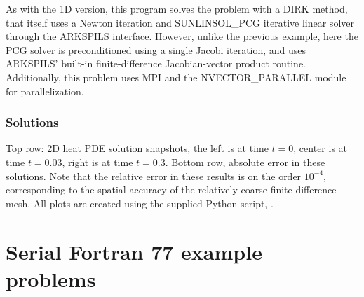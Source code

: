 \documentclass[letterpaper,10pt,english]{sphinxmanual}
\begin{document}
As with the 1D version, this program solves the problem with a DIRK
method, that itself uses a Newton iteration and SUNLINSOL\_PCG
iterative linear solver through the ARKSPILS interface.  However,
unlike the previous example, here the PCG solver is preconditioned
using a single Jacobi iteration, and uses ARKSPILS’ built-in
finite-difference Jacobian-vector product routine. Additionally, this
problem uses MPI and the NVECTOR\_PARALLEL module for parallelization.


\subsection{Solutions}
\label{\detokenize{cpp_parallel:solutions}}
Top row: 2D heat PDE solution snapshots, the left is at time \(t=0\),
center is at time \(t=0.03\), right is at time \(t=0.3\).
Bottom row, absolute error in these solutions.  Note that the relative
error in these results is on the order \(10^{-4}\), corresponding
to the spatial accuracy of the relatively coarse finite-difference
mesh.  All plots are created using the supplied Python script,
.

\noindent{}

\noindent{}

\noindent{}

\noindent{}

\noindent{}

\noindent{}


\chapter{Serial Fortran 77 example problems}
\label{\detokenize{f77_serial::doc}}\label{\detokenize{f77_serial:serial-f77}}\label{\detokenize{f77_serial:serial-fortran-77-example-problems}}
\end{document}
